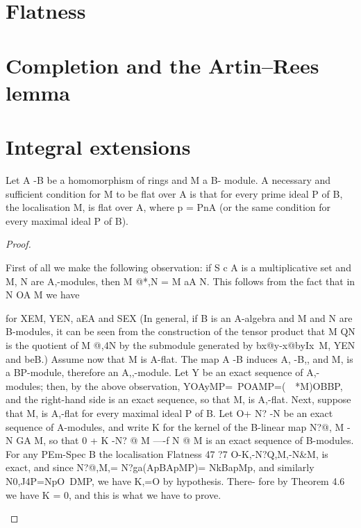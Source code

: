 
\section{Flatness}
\section{Completion and the Artin--Rees lemma}
\section{Integral extensions}

\begin{theorem}[Theorem 7.1]\label{mcrt-auto-theorem-7-1}
\begin{mathematicalrecord}
Let A -B       be a homomorphism      of rings and M a B-
module. A necessary and sufficient condition for M to be flat over A is that
for every prime ideal P of B, the localisation M, is flat over A, where
p = PnA (or the same condition for every maximal ideal P of B).
\end{mathematicalrecord}
\end{theorem}
\begin{proof}
\begin{mathematicalrecord}
First of all we make the following observation: if S c A is a
multiplicative  set and M, N are A,-modules, then M @*,N = M aA N.
This follows from the fact that in N OA M we have



for XEM, YEN, aEA and SEX (In general, if B is an A-algebra and
M and N are B-modules, it can be seen from the construction of the tensor
product that M QN is the quotient of M @,4N by the submodule generated
by {bx@y-x@byIx~M,        YEN and beB}.)
   Assume now that M is A-flat. The map A -B          induces A, -B,,
and M, is a BP-module, therefore an A,,-module. Let Y be an exact
sequence of A,-modules; then, by the above observation,
         YOAyMP=~POAMP=(~~*M)OBBP,
and the right-hand side is an exact sequence, so that M, is A,-flat.
   Next, suppose that M, is A,-flat for every maximal ideal P of B.
Let O+ N? -N       be an exact sequence of A-modules, and write K
for the kernel of the B-linear map N?@, M -N             GA M, so that
0 + K -N?     @ M ----f N @ M is an exact sequence of B-modules. For
any PEm-Spec B the localisation
Flatness                                                       47
?7
        O-K,-N?Q,M,-N&M,
is exact, and since N?@,M,=       N?ga(ApBApMP)=     NkBapMp,      and
similarly N0,J4P=NpO~DMP,     we have K,=O by hypothesis. There-
fore by Theorem 4.6 we have K = 0, and this is what we have to prove.
\end{mathematicalrecord}
\end{proof}


